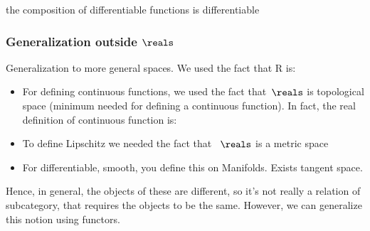 {    \begin{example}
        the composition of differentiable functions is differentiable
    \end{example}


    \subsubsection{Generalization outside $\reals$}
    Generalization to more general spaces.
    We used the fact that R is:
    \begin{itemize}
        \item For defining continuous functions, we used the fact that~$\reals$ is topological space (minimum needed for defining a continuous function).
              In fact, the real definition of continuous function is:


        \item To define Lipschitz we needed the fact that~ $\reals$ is a metric space
        \item For differentiable, smooth, you define this on Manifolds.
              Exists tangent space.
    \end{itemize}

    Hence, in general, the objects of these are different, so it's not really a relation of subcategory, that requires the objects to be the same.
    However, we can generalize this notion using functors.

}

